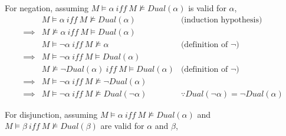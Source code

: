 \documentclass{article}
\begin{document}
\begin{enumerate}
For negation,
assuming \(M \models \alpha\ \mathit{iff}\ M \not\models Dual(\alpha)\) is valid for \(\alpha\),
\[
\begin{array}{rll}
   & M \models \alpha\ \mathit{iff}\ M \not\models Dual(\alpha) & \text{(induction hypothesis)}\\
 \implies & M \not\models \alpha\ \mathit{iff}\ M \models Dual(\alpha) \\
 & M \models \neg \alpha \ \mathit{iff}\ M \not\models \alpha & \text{(definition of \(\neg\))}\\
 \implies & M \models \neg \alpha \ \mathit{iff}\ M \models Dual(\alpha) \\
 & M \not\models \neg Dual(\alpha)\ \mathit{iff}\ M \models Dual(\alpha)  & \text{(definition of \(\neg\))}\\
 \implies & M \models \neg \alpha \ \mathit{iff}\ M \not\models \neg Dual(\alpha) \\
 \implies & M \models \neg \alpha \ \mathit{iff}\ M \not\models Dual(\neg \alpha) & \because Dual(\neg\alpha) = \neg Dual(\alpha)
\end{array}
\]

For disjunction,
assuming \(M \models \alpha\ \mathit{iff}\ M \not\models Dual(\alpha)\) 
and \(M \models \beta\ \mathit{iff}\ M \not\models Dual(\beta)\) are valid for \(\alpha\) and \(\beta\),
\[
\begin{array}{rll}


\end{array}\]
\end{enumerate}
\end{document}
